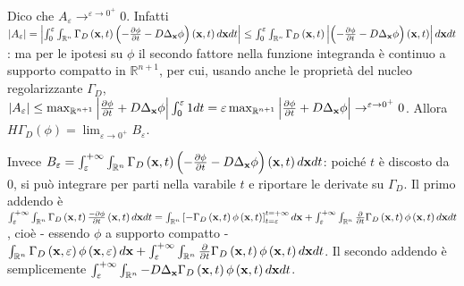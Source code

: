 \documentclass{article}
\begin{document}
Dico che $A_{\varepsilon }\rightarrow ^{\varepsilon \rightarrow 0^{+}}0$.
Infatti $\left\vert A_{\varepsilon }\right\vert =\left\vert
\int_{0}^{\varepsilon }\int_{%
\mathbb{R}
^{n}}\Gamma _{D}\left( \mathbf{x},t\right) \left( -\frac{\partial \phi }{%
\partial t}-D\Delta _{\mathbf{x}}\phi \right) \left( \mathbf{x},t\right) d%
\mathbf{x}dt\right\vert \leq \int_{0}^{\varepsilon }\int_{%
\mathbb{R}
^{n}}\Gamma _{D}\left( \mathbf{x},t\right) \left\vert \left( -\frac{\partial
\phi }{\partial t}-D\Delta _{\mathbf{x}}\phi \right) \left( \mathbf{x}%
,t\right) \right\vert d\mathbf{x}dt$: ma per le ipotesi su $\phi $ il
secondo fattore nella funzione integranda \`{e} continuo a supporto compatto
in $%
\mathbb{R}
^{n+1}$, per cui, usando anche le propriet\`{a} del nucleo regolarizzante $%
\Gamma _{D}$, $\left\vert A_{\varepsilon }\right\vert \leq \max_{%
\mathbb{R}
^{n+1}}\left\vert \frac{\partial \phi }{\partial t}+D\Delta _{\mathbf{x}%
}\phi \right\vert \int_{0}^{\varepsilon }1dt=\varepsilon \max_{%
\mathbb{R}
^{n+1}}\left\vert \frac{\partial \phi }{\partial t}+D\Delta _{\mathbf{x}%
}\phi \right\vert \rightarrow ^{\varepsilon \rightarrow 0^{+}}0$. Allora $%
H\Gamma _{D}\left( \phi \right) =\lim_{\varepsilon \rightarrow
0^{+}}B_{\varepsilon }$.

Invece $B_{\varepsilon }=\int_{\varepsilon }^{+\infty }\int_{%
\mathbb{R}
^{n}}\Gamma _{D}\left( \mathbf{x},t\right) \left( -\frac{\partial \phi }{%
\partial t}-D\Delta _{\mathbf{x}}\phi \right) \left( \mathbf{x},t\right) d%
\mathbf{x}dt$: poich\'{e} $t$ \`{e} discosto da $0$, si pu\`{o} integrare
per parti nella varabile $t$ e riportare le derivate su $\Gamma _{D}$. Il
primo addendo \`{e} $\int_{\varepsilon }^{+\infty }\int_{%
\mathbb{R}
^{n}}\Gamma _{D}\left( \mathbf{x},t\right) \frac{-\partial \phi }{\partial t}%
\left( \mathbf{x},t\right) d\mathbf{x}dt=\int_{%
\mathbb{R}
^{n}}\left[ -\Gamma _{D}\left( \mathbf{x},t\right) \phi \left( \mathbf{x}%
,t\right) \right] _{t=\varepsilon }^{t=+\infty }d\mathbf{x}%
+\int_{\varepsilon }^{+\infty }\int_{%
\mathbb{R}
^{n}}\frac{\partial }{\partial t}\Gamma _{D}\left( \mathbf{x},t\right) \phi
\left( \mathbf{x},t\right) d\mathbf{x}dt$, cio\`{e} - essendo $\phi $ a
supporto compatto - $\int_{%
\mathbb{R}
^{n}}\Gamma _{D}\left( \mathbf{x},\varepsilon \right) \phi \left( \mathbf{x}%
,\varepsilon \right) d\mathbf{x}+\int_{\varepsilon }^{+\infty }\int_{%
\mathbb{R}
^{n}}\frac{\partial }{\partial t}\Gamma _{D}\left( \mathbf{x},t\right) \phi
\left( \mathbf{x},t\right) d\mathbf{x}dt$. Il secondo addendo \`{e}
semplicemente $\int_{\varepsilon }^{+\infty }\int_{%
\mathbb{R}
^{n}}-D\Delta _{\mathbf{x}}\Gamma _{D}\left( \mathbf{x},t\right) \phi \left( 
\mathbf{x},t\right) d\mathbf{x}dt$.
\end{document}
